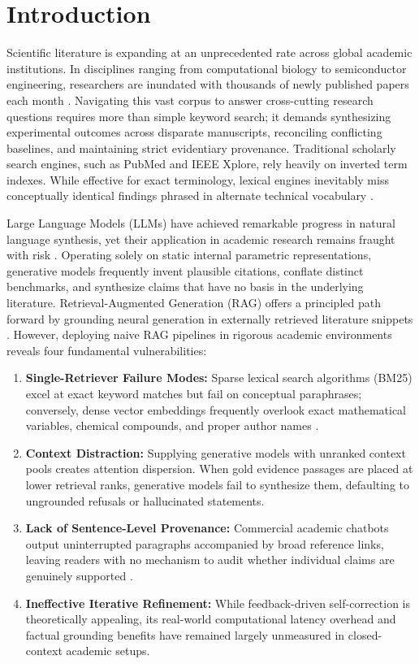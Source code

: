 \documentclass[conference]{IEEEtran}
\begin{document}
\section{Introduction}
Scientific literature is expanding at an unprecedented rate across global academic institutions. In disciplines ranging from computational biology to semiconductor engineering, researchers are inundated with thousands of newly published papers each month \cite{lewis2020rag}. Navigating this vast corpus to answer cross-cutting research questions requires more than simple keyword search; it demands synthesizing experimental outcomes across disparate manuscripts, reconciling conflicting baselines, and maintaining strict evidentiary provenance. Traditional scholarly search engines, such as PubMed and IEEE Xplore, rely heavily on inverted term indexes. While effective for exact terminology, lexical engines inevitably miss conceptually identical findings phrased in alternate technical vocabulary \cite{karpukhin2020dpr}.

Large Language Models (LLMs) have achieved remarkable progress in natural language synthesis, yet their application in academic research remains fraught with risk \cite{liu2023evaluating}. Operating solely on static internal parametric representations, generative models frequently invent plausible citations, conflate distinct benchmarks, and synthesize claims that have no basis in the underlying literature. Retrieval-Augmented Generation (RAG) offers a principled path forward by grounding neural generation in externally retrieved literature snippets \cite{lewis2020rag}. However, deploying naive RAG pipelines in rigorous academic environments reveals four fundamental vulnerabilities:
\begin{enumerate}
    \item \textbf{Single-Retriever Failure Modes:} Sparse lexical search algorithms (BM25) excel at exact keyword matches but fail on conceptual paraphrases; conversely, dense vector embeddings frequently overlook exact mathematical variables, chemical compounds, and proper author names \cite{robertson2009bm25}.
    \item \textbf{Context Distraction:} Supplying generative models with unranked context pools creates attention dispersion. When gold evidence passages are placed at lower retrieval ranks, generative models fail to synthesize them, defaulting to ungrounded refusals or hallucinated statements.
    \item \textbf{Lack of Sentence-Level Provenance:} Commercial academic chatbots output uninterrupted paragraphs accompanied by broad reference links, leaving readers with no mechanism to audit whether individual claims are genuinely supported \cite{menick2022teaching}.
    \item \textbf{Ineffective Iterative Refinement:} While feedback-driven self-correction is theoretically appealing, its real-world computational latency overhead and factual grounding benefits have remained largely unmeasured in closed-context academic setups.
\end{enumerate}
\end{document}
